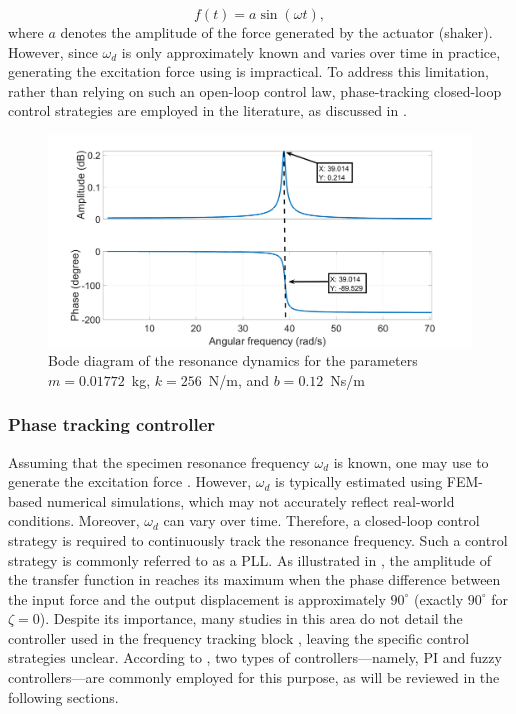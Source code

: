 \documentclass[preprint,12pt]{elsarticle}
\begin{document}
\begin{equation}
f(t)=a\sin(\omega t),
\label{E_F_resonance}
\end{equation}
where $a$ denotes the amplitude of the force generated by the actuator (shaker). However, since $\omega_d$ is only approximately known and varies over time in practice, generating the excitation force using  is impractical. To address this limitation, rather than relying on such an open-loop control law, phase-tracking closed-loop control strategies are employed in the literature, as discussed in .

\begin{figure}
    \centering    \includegraphics[width=\linewidth]{F_bode.png}
    \caption{Bode diagram of the resonance dynamics for the parameters $m=0.01772$~kg, $k=256$~N/m, and $b=0.12$~Ns/m}
    \label{F_Bode}
\end{figure}




\subsubsection{Phase tracking controller} \label{S_frequency_controller}


Assuming that the specimen resonance frequency $\omega_d$ is known, one may use  to generate the excitation force \cite{SCHNEIDER2018171,herrmann2018simulation_Thesis,SCHRAMM2024117045}. However, $\omega_d$ is typically estimated using FEM-based numerical simulations, which may not accurately reflect real-world conditions. Moreover, $\omega_d$ can vary over time. Therefore, a closed-loop control strategy is required to continuously track the resonance frequency. Such a control strategy is commonly referred to as a PLL. As illustrated in , the amplitude of the transfer function in  reaches its maximum when the phase difference between the input force and the output displacement is approximately $90^\circ$ (exactly $90^\circ$ for $\zeta = 0$). Despite its importance, many studies in this area do not detail the controller used in the frequency tracking block \cite{Gautrelet_2020}, leaving the specific control strategies unclear. According to , two types of controllers—namely, PI and fuzzy controllers—are commonly employed for this purpose, as will be reviewed in the following sections.
\end{document}
